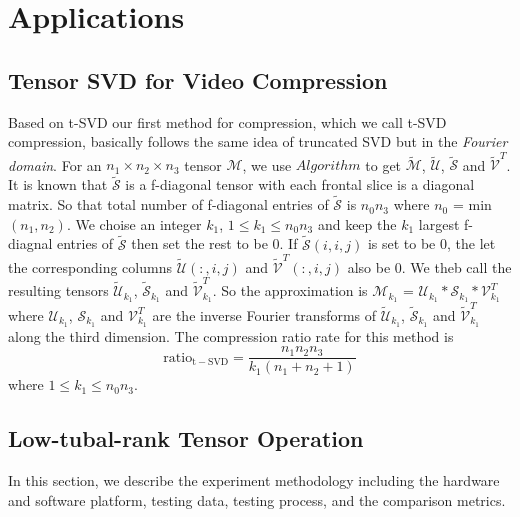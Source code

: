 \documentclass[format=acmsmall, review=false, screen=true]{acmart}
\begin{document}
\section{Applications}

\subsection{Tensor SVD for Video Compression}
Based on t-SVD our first method for compression, which we call t-SVD compression, basically follows the same idea of truncated SVD but in the \textit{Fourier domain}. For an $n_1 \times n_2 \times n_3$ tensor $\mathcal{M}$, we use $Algorithm$ to get $\widetilde{\mathcal{M}}$, $\widetilde{\mathcal{U}}$, $\widetilde{\mathcal{S}}$ and $\widetilde{\mathcal{V}}^T$. It is known that $\widetilde{\mathcal{S}}$ is a f-diagonal tensor with each frontal slice is a diagonal matrix. So that total number of f-diagonal entries of $\widetilde{\mathcal{S}}$ is $n_0n_3$ where $n_0$ = min$(n_1, n_2)$. We choise an integer $k_1$, $1 \leq k_1 \leq n_0n_3$ and keep the $k_1$ largest f-diagnal entries of $\widetilde{\mathcal{S}}$ then set the rest to be 0. If $\widetilde{\mathcal{S}}(i,i,j)$ is set to be 0, the let the corresponding columns $\widetilde{\mathcal{U}}(:,i,j)$ and $\widetilde{\mathcal{V}}^T(:,i,j)$ also be 0. We theb call the resulting tensors $\widetilde{\mathcal{U}}_{k_1}$, $\widetilde{\mathcal{S}}_{k_1}$ and $\widetilde{\mathcal{V}}^T_{k_1}$. So the approximation is $\mathcal{M}_{k_1}$ = $\mathcal{U}_{k_1} \ast \mathcal{S}_{k_1} \ast \mathcal{V}^T_{k_1}$ where $\mathcal{U}_{k_1}$, $\mathcal{S}_{k_1}$ and $\mathcal{V}^T_{k_1}$ are the inverse Fourier transforms of $\widetilde{\mathcal{U}}_{k_1}$, $\widetilde{\mathcal{S}}_{k_1}$ and $\widetilde{\mathcal{V}}^T_{k_1}$ along the third dimension. The compression ratio rate for this method is 
$$
\mathrm{ratio_{t-SVD}} = \frac{n_1n_2n_3}{k_1(n_1 + n_2 + 1)}
$$
where $1 \leq k_1 \leq n_0n_3$.

\subsection{Low-tubal-rank Tensor Operation}
In this section, we describe the experiment methodology including the hardware and software platform, testing data, testing process, and the comparison metrics.
\end{document}
